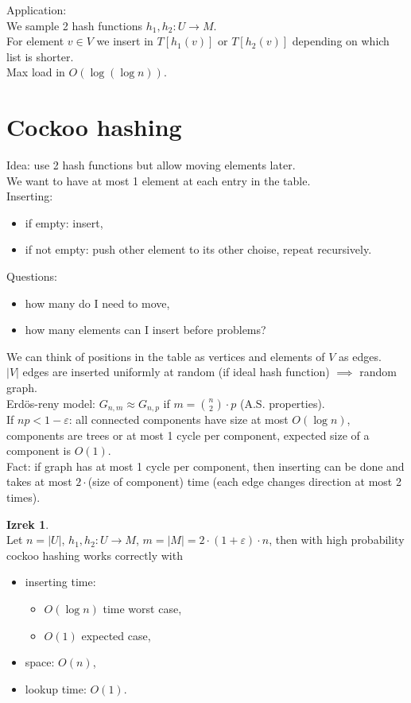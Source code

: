 \documentclass[a4paper, 12pt]{book}
\theoremstyle{definition}
\newtheorem{theorem}[counter]{Izrek}
\theoremstyle{remark}
\begin{document}
Application: \\
We sample 2 hash functions $h_1, h_2: U \to M$. \\
For element $v \in V$ we insert in $T[h_1(v)]$ or $T[h_2(v)]$ depending on which list is shorter. \\
Max load in $O(\log (\log n))$.


\section{Cockoo hashing}

Idea: use 2 hash functions but allow moving elements later. \\
We want to have at most 1 element at each entry in the table. \\
Inserting: %
\begin{itemize}
  \item if empty: insert,
  \item if not empty: push other element to its other choise, repeat recursively.
\end{itemize}
Questions:
\begin{itemize}
  \item how many do I need to move,
  \item how many elements can I insert before problems?
\end{itemize}
We can think of positions in the table as vertices and elements of $V$ as edges. \\
$|V|$ edges are inserted uniformly at random (if ideal hash function)
$\implies$ random graph. \\
Erdös-reny model: $G_{n,m} \approx G_{n,p}$ if $m = \binom{n}{2} \cdot p$ (A.S. properties). \\
If $np < 1 - \varepsilon$: all connected components have size at most $O(\log n)$,
components are trees or at most 1 cycle per component, expected size of a component is $O(1)$. \\
Fact: if graph has at most 1 cycle per component, then inserting can be done and takes at most
$2 \cdot $(size of component) time (each edge changes direction at most 2 times).
\begin{theorem} \text{} \\
  Let $n = |U|$, $h_1, h_2: U \to M$, $m = |M| = 2 \cdot (1 + \varepsilon) \cdot n$,
  then with high probability cockoo hashing works correctly with
  \begin{itemize}
    \item inserting time:
      \begin{itemize}
        \item $O(\log n)$ time worst case,
        \item $O(1)$ expected case,
      \end{itemize}
    \item space: $O(n)$,
    \item lookup time: $O(1)$.
  \end{itemize}
\end{theorem}
\end{document}
